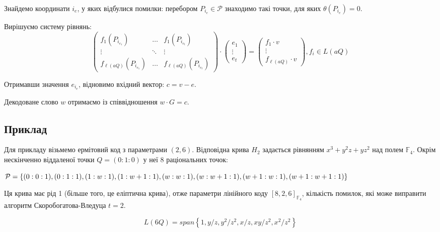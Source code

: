 \documentclass[a4paper,14pt,oneside]{extarticle}
\begin{document}
Знайдемо координати $i_e$, у яких відбулися помилки: перебором $P_{i_e} \in \mathcal{P}$ знаходимо такі точки, для яких $\theta(P_{i_e})=0$.

Вирішуємо систему рівнянь:
$$
\begin{pmatrix}
    f_1 ( P_{i_{e_1}} ) & \dots & f_1 ( P_{i_{e_t}} ) \\
    \vdots & \ddots & \vdots \\
    f_{\ell(aQ)} ( P_{i_{e_1}} ) & \dots & f_{\ell(aQ)} ( P_{i_{e_t}} )
\end{pmatrix} \cdot 
\begin{pmatrix}
    e_1 \\
    \vdots \\
    e_t
\end{pmatrix} = 
\begin{pmatrix}
    f_1 \cdot v \\
    \vdots \\
    f_{\ell(aQ)} \cdot v
\end{pmatrix}, f_i \in L(aQ)
$$

Отримавши значення $e_{i_e}$, відновимо вхідний вектор: $c = v - e$.

Декодоване слово $w$ отримаємо із співвідношення $w \cdot G = c$.



\subsection{Приклад}
Для прикладу візьмемо ермітовий код з параметрами $(2,6)$. Відповідна крива $H_2$ задається рівнянням $x^3 + y^2 z + y z^2$ над полем $\mathbb{F}_4$. 
Окрім нескінченно віддаленої точки $Q = (0 : 1 : 0)$ у неї 8 раціональних точок:

$\mathcal{P} = \{ (0 : 0 : 1), (0 : 1 : 1), (1 : w : 1), (1 : w + 1 : 1), (w : w : 1), \\
 (w : w + 1 : 1), (w + 1 : w : 1), (w + 1 : w + 1 : 1)\}$

Ця крива має рід 1 (більше того, це еліптична крива), отже параметри лінійного коду $[8, 2, 6]_{\mathbb{F}_4}$, кількість помилок, які може виправити 
алгоритм Скоробогатова-Вледуца $t=2$.

$$L(6Q) = span \left \{ 1, y/z, y^2/z^2, x/z, xy/z^2, x^2/z^2 \right \}$$
\end{document}
